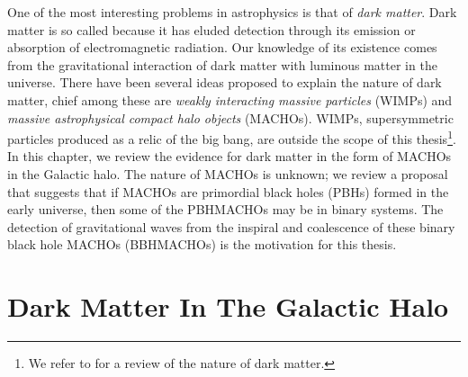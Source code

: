 
One of the most interesting problems in astrophysics is that of \emph{dark
matter}. Dark matter is so called because it has eluded detection through its
emission or absorption of electromagnetic radiation. Our knowledge of its
existence comes from the gravitational interaction of dark matter with
luminous matter in the universe. There have been several ideas proposed to
explain the nature of dark matter, chief among these are \emph{weakly
interacting massive particles} (WIMPs) and \emph{massive astrophysical
compact halo objects} (MACHOs)\cite{Griest:1990vu}.  WIMPs, supersymmetric
particles produced as a relic of the big bang, are outside the scope of this
thesis\footnote{We refer to \cite{Griest:1995gs} for a review of the nature of
dark matter.}. In this chapter, we review the evidence for dark matter in the
form of MACHOs in the Galactic halo. The nature of MACHOs is unknown; we
review a proposal that suggests that if MACHOs are primordial black holes
(PBHs) formed in the early universe, then some of the PBHMACHOs may be in
binary systems\cite{Nakamura:1997sm}. The detection of gravitational waves
from the inspiral and coalescence of these binary black hole MACHOs
(BBHMACHOs) is the motivation for this thesis.

\section{Dark Matter In The Galactic Halo}
\label{s:darkmatter}

